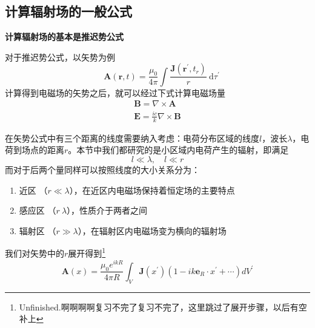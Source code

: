     \subsection{计算辐射场的一般公式}
        \textbf{计算辐射场的基本是推迟势公式}

        对于推迟势公式，以矢势为例\[\quad \boldsymbol{A}(\boldsymbol{r}, t)=\frac{\mu_{0}}{4 \pi} \int \frac{\boldsymbol{J}\left(\boldsymbol{r}^{\prime}, t_{r}\right)}{r} \mathrm{~d} \tau^{\prime}\]计算得到电磁场的矢势之后，就可以经过下式计算电磁场量
        \begin{equation}
            \boxed{\begin{gathered}
                \boldsymbol{B} = \nabla \times \boldsymbol{A} \\
                \boldsymbol{E} = \frac{i c}{k} \nabla \times \boldsymbol{B}
            \end{gathered}}
        \end{equation}

        在矢势公式中有三个距离的线度需要纳入考虑：电荷分布区域的线度$l$，波长$\lambda$，电荷到场点的距离$r$。本节中我们都研究的是小区域内电荷产生的辐射，即满足\[l \ll \lambda, \quad l \ll r\]而对于后两个量同样可以按照线度的大小关系分为：
        \begin{enumerate}[(1).]
            \item 近区 （$r \ll \lambda$），在近区内电磁场保持着恒定场的主要特点
            \item 感应区 （$r ~ \lambda$），性质介于两者之间
            \item 辐射区 （$r \gg \lambda$），在辐射区内电磁场变为横向的辐射场
        \end{enumerate}
        
        我们对矢势中的$r$展开得到\footnote{Unfinished.啊啊啊啊复习不完了复习不完了，这里跳过了展开步骤，以后有空补上}
        \begin{equation}
            \label{eq.5_13}
            \boldsymbol{A}(x) = \frac{\mu_0 e^{ikR}}{4 \pi R}\int_V \boldsymbol{J}(x^\prime)(1-ik\mathbf{e}_R \cdot x^\prime + \cdots)dV^\prime
        \end{equation}
